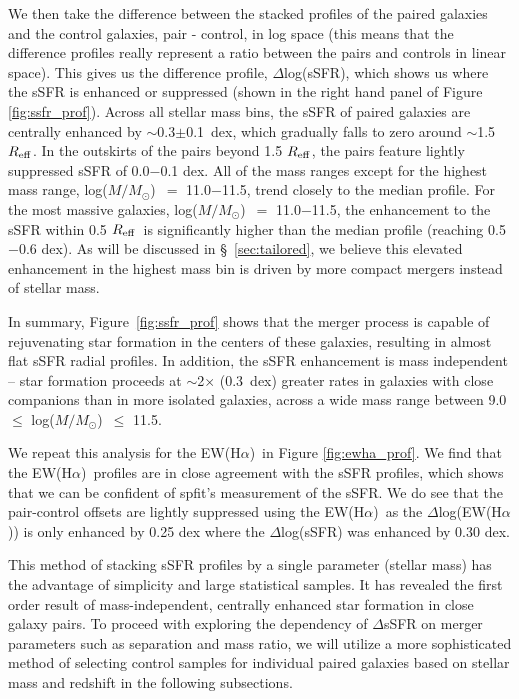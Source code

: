 \documentclass[apj,twocolumn]{emulateapj}
\newcommand{\reff}{$R_{\rm eff}$}
\newcommand{\ewha}{EW(H$\alpha$)}
\newcommand{\logm}{log($M/M_{\odot}$)}
\begin{document}
\begin{CJK*}{UTF8}{gbsn}
We then take the difference between the stacked profiles of the paired galaxies and the control galaxies, pair - control, in log space (this means that the difference profiles really represent a ratio between the pairs and controls in linear space). This gives us the difference profile, $\Delta$log(sSFR), which shows us where the sSFR is enhanced or suppressed (shown in the right hand panel of Figure \ref{fig:ssfr_prof}). Across all stellar mass bins, the sSFR of paired galaxies are centrally enhanced by $\sim$0.3$\pm$0.1~dex, which gradually falls to zero around $\sim$1.5 \reff. In the outskirts of the pairs beyond 1.5 \reff, the pairs feature lightly suppressed sSFR of 0.0$-$0.1 dex. All of the mass ranges except for the highest mass range, \logm\ $=$ 11.0$-$11.5, trend closely to the median profile. For the most massive galaxies, \logm\ $=$ 11.0$-$11.5, the enhancement to the sSFR within 0.5 \reff\ is significantly higher than the median profile (reaching 0.5$-$0.6 dex). As will be discussed in \S~\ref{sec:tailored}, we believe this elevated enhancement in the highest mass bin is driven by more compact mergers instead of stellar mass. 

In summary, Figure~\ref{fig:ssfr_prof} shows that the merger process is capable of rejuvenating star formation in the centers of these galaxies, resulting in almost flat sSFR radial profiles. In addition, the sSFR enhancement is mass independent -- star formation proceeds at $\sim$2$\times$ (0.3~dex) greater rates in galaxies with close companions than in more isolated galaxies, across a wide mass range between 9.0 $\leq$ \logm\ $\leq$ 11.5.

We repeat this analysis for the \ewha\ in Figure \ref{fig:ewha_prof}. We find that the \ewha\ profiles are in close agreement with the sSFR profiles, which shows that we can be confident of {\sc spfit}'s measurement of the sSFR. We do see that the pair-control offsets are lightly suppressed using the \ewha\ as the $\Delta$log(\ewha) is only enhanced by 0.25 dex where the $\Delta$log(sSFR) was enhanced by 0.30 dex. 

This method of stacking sSFR profiles by a single parameter (stellar mass) has the advantage of simplicity and large statistical samples. It has revealed the first order result of mass-independent, centrally enhanced star formation in close galaxy pairs. To proceed with exploring the dependency of $\Delta$sSFR on merger parameters such as separation and mass ratio, we will utilize a more sophisticated method of selecting control samples for individual paired galaxies based on stellar mass and redshift in the following subsections.  


\end{CJK*}
\end{document}
